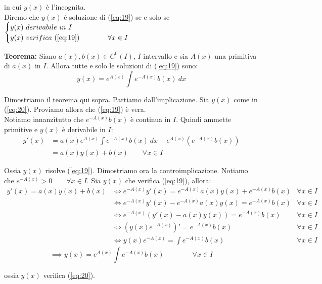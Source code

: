 \documentclass{article}
\begin{document}
\noindent in cui $y(x)$ è l'incognita. \\
Diremo che $y(x)$ è soluzione di (\ref{eq:19}) se e solo se $\begin{cases}
    y(x) \ derivabile \ in \ I \\
        y(x) \ verifica \ (\ref{eq:19}) \qquad \qquad \forall x \in I
\end{cases}$

\noindent\textbf{Teorema:} Siano $a(x), b(x) \in C^0(I)$, $I$ intervallo e sia $A(x)$ una primitiva di $a(x)$ in $I$. Allora tutte e solo le soluzioni di (\ref{eq:19}) sono: 
\begin{equation}
    y(x) = e^{A(x)} \int e^{-A(x)}b(x) \ dx
    \label{eq:20}
\end{equation}

\noindent Dimostriamo il teorema qui sopra. Partiamo dall'implicazione. Sia $y(x)$ come in (\ref{eq:20}). Proviamo allora che (\ref{eq:19}) è vera. \\
Notiamo innanzitutto che $e^{-A(x)} b(x)$ è continua in $I$. Quindi ammette primitive e $y(x)$ è derivabile in $I$:
\begin{align*}
    y'(x) &= a(x) e^{A(x)} \int e^{-A(x)}b(x) \ dx + e^{A(x)}(e^{-A(x)}b(x)) \\
    &= a(x)y(x) + b(x) \qquad \forall x \in I
\end{align*}

\noindent Ossia $y(x)$ risolve (\ref{eq:19}). Dimostriamo ora la controimplicazione. Notiamo che $e^{-A(x)} > 0 \qquad \forall x \in I$. Sia $y(x)$ che verifica (\ref{eq:19}), allora:
\begin{align*}
    y'(x) = a(x)y(x) + b(x) & \iff e^{-A(x)}y'(x) = e^{-A(x)}a(x)y(x) + e^{-A(x)}b(x) & \forall x \in I \\
    & \iff e^{-A(x)}y'(x) - e^{-A(x)}a(x)y(x) = e^{-A(x)}b(x) & \forall x \in I \\
    & \iff e^{-A(x)}(y'(x) - a(x)y(x)) = e^{-A(x)}b(x) & \forall x \in I \\
    & \iff (y(x)e^{-A(x)})' = e^{-A(x)}b(x) & \forall x \in I \\
    & \iff y(x)e^{-A(x)} = \int e^{-A(x)}b(x) & \forall x \in I 
\end{align*}
\begin{equation*}
    \implies y(x) = e^{A(x)} \int e^{-A(x)}b(x) \qquad \qquad  \forall x \in I
\end{equation*}

\noindent ossia $y(x)$ verifica (\ref{eq:20}). \\
\end{document}

